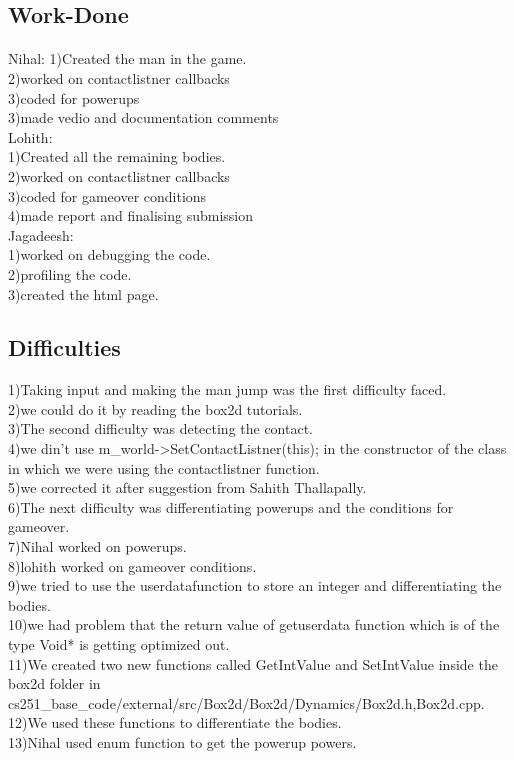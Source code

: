 \documentclass{article}
\begin{document}
\subsection{Work-Done}
\paragraph{}
Nihal:
 1)Created the man in the game.\\
 2)worked on contactlistner callbacks\\
 3)coded for powerups\\
 3)made vedio and documentation comments\\

Lohith:\\
 1)Created all the remaining bodies.\\
 2)worked on contactlistner callbacks\\
 3)coded for gameover conditions\\
 4)made report and finalising submission\\

 Jagadeesh:\\
 1)worked on debugging the code.\\
 2)profiling the code.\\
 3)created the html page.\\

\subsection{Difficulties}
1)Taking input and making the man jump was the first difficulty faced.\\
2)we could do it by reading the box2d tutorials.\\
3)The second difficulty was detecting the contact.\\
4)we din't use m\_world->SetContactListner(this); in the constructor of the class in which we were using the contactlistner function.\\
5)we corrected it after suggestion from Sahith Thallapally.\\
6)The next difficulty was differentiating powerups and the conditions for gameover.\\
7)Nihal worked on powerups.\\
8)lohith worked on gameover conditions.\\
9)we tried to use the userdatafunction to store an integer and differentiating the bodies.\\
10)we had problem that the return value of getuserdata function which is of the type Void* is getting optimized out.\\
11)We created two new functions called GetIntValue and SetIntValue inside the box2d folder in cs251\_base\_code/external/src/Box2d/Box2d/Dynamics/Box2d.h,Box2d.cpp.\\
12)We used these functions to differentiate the bodies.\\
13)Nihal used enum function to get the powerup powers.\\
\end{document}
